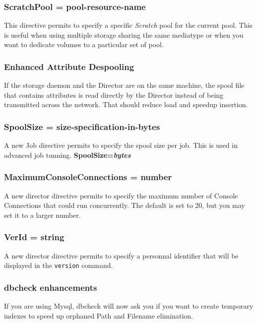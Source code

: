 \subsubsection{ScratchPool = \lt{}pool-resource-name\gt{}}
This directive permits to specify a specific \textsl{Scratch} pool for the
current pool. This is useful when using multiple storage sharing the same
mediatype or when you want to dedicate volumes to a particular set of pool.

\subsubsection{Enhanced Attribute Despooling}
If the storage daemon and the Director are on the same machine, the spool file
that contains attributes is read directly by the Director instead of being
transmitted across the network. That should reduce load and speedup insertion.

\subsubsection{SpoolSize = \lt{}size-specification-in-bytes\gt{}}
A new Job directive permits to specify the spool size per job. This is used
in advanced job tunning. {\bf SpoolSize={\it bytes}}

\subsubsection{MaximumConsoleConnections = \lt{}number\gt{}}
A new director directive permits to specify the maximum number of Console
Connections that could run concurrently. The default is set to 20, but you may
set it to a larger number.

\subsubsection{VerId = \lt{}string\gt{}}
A new director directive permits to specify a personnal identifier that will be
displayed in the \texttt{version} command.

\subsubsection{dbcheck enhancements}
If you are using Mysql, dbcheck will now ask you if you want to create
temporary indexes to speed up orphaned Path and Filename elimination. 

